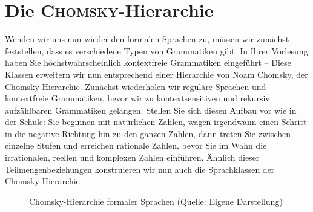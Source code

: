\documentclass[11pt,a4paper]{scrreport}
\theoremstyle{remark}
\theoremstyle{custom}
\begin{document}
\section{Die \textsc{Chomsky}-Hierarchie}
Wenden wir uns nun wieder den formalen Sprachen zu, müssen wir zunächst feststellen, dass es verschiedene Typen von Grammatiken gibt. In Ihrer Vorlesung haben Sie höchstwahrscheinlich kontextfreie Grammatiken eingeführt -- Diese Klassen erweitern wir nun entsprechend einer Hierarchie von Noam Chomsky, der Chomsky-Hierarchie. Zunächst wiederholen wir reguläre Sprachen und kontextfreie Grammatiken, bevor wir zu kontextsensitiven und rekursiv aufzählbaren Grammatiken gelangen. Stellen Sie sich diesen Aufbau vor wie in der Schule: Sie beginnen mit natürlichen Zahlen, wagen irgendwann einen Schritt in die negative Richtung hin zu den ganzen Zahlen, dann treten Sie zwischen einzelne Stufen und erreichen rationale Zahlen, bevor Sie im Wahn die irrationalen, reellen und komplexen Zahlen einführen. Ähnlich dieser Teilmengenbeziehungen konstruieren wir nun auch die Sprachklassen der Chomsky-Hierarchie.
\begin{figure}[h!]
\centering
{}
\caption{Chomsky-Hierarchie formaler Sprachen (Quelle: Eigene Darstellung)}
\end{figure}
\end{document}
